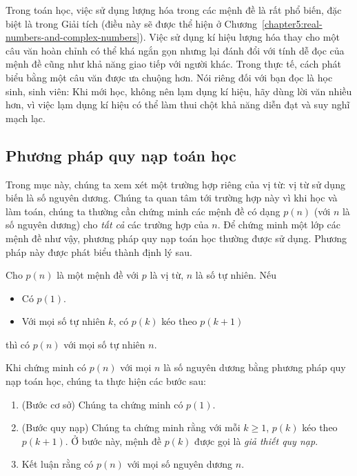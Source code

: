 Trong toán học, việc sử dụng lượng hóa trong các mệnh đề là rất phổ biến, đặc biệt là trong Giải tích (điều này sẽ được thể hiện ở Chương~\ref{chapter5:real-numbers-and-complex-numbers}). Việc sử dụng kí hiệu lượng hóa thay cho một câu văn hoàn chỉnh có thể khá ngắn gọn nhưng lại đánh đổi với tính dễ đọc của mệnh đề cũng như khả năng giao tiếp với người khác. Trong thực tế, cách phát biểu bằng một câu văn được ưa chuộng hơn. Nói riêng đối với bạn đọc là học sinh, sinh viên: Khi mới học, không nên lạm dụng kí hiệu, hãy dùng lời văn nhiều hơn, vì việc lạm dụng kí hiệu có thể làm thui chột khả năng diễn đạt và suy nghĩ mạch lạc.

\subsection*{Phương pháp quy nạp toán học}

Trong mục này, chúng ta xem xét một trường hợp riêng của vị từ: vị từ sử dụng biến là số nguyên dương. Chúng ta quan tâm tới trường hợp này vì khi học và làm toán, chúng ta thường cần chứng minh các mệnh đề có dạng $p(n)$ (với $n$ là số nguyên dương) cho \textit{tất cả} các trường hợp của $n$. Để chứng minh một lớp các mệnh đề như vậy, phương pháp quy nạp toán học thường được sử dụng. Phương pháp này được phát biểu thành định lý sau.

\bigskip

\begin{theorem}
    Cho $p(n)$ là một mệnh đề với $p$ là vị từ, $n$ là số tự nhiên. Nếu
    \begin{itemize}
        \item Có $p(1)$.
        \item Với mọi số tự nhiên $k$, có $p(k)$ kéo theo $p(k + 1)$
    \end{itemize}

    thì có $p(n)$ với mọi số tự nhiên $n$.
\end{theorem}

Khi chứng minh có $p(n)$ với mọi $n$ là số nguyên dương bằng phương pháp quy nạp toán học, chúng ta thực hiện các bước sau:

\begin{enumerate}[label={\textbf{Bước \arabic*.}},itemindent=1cm]
    \item (Bước cơ sở) Chúng ta chứng minh có $p(1)$.
    \item (Bước quy nạp) Chúng ta chứng minh rằng với mỗi $k\geq 1$, $p(k)$ kéo theo $p(k+1)$. Ở bước này, mệnh đề $p(k)$ được gọi là \textit{giả thiết quy nạp}.
    \item Kết luận rằng có $p(n)$ với mọi số nguyên dương $n$.
\end{enumerate}

